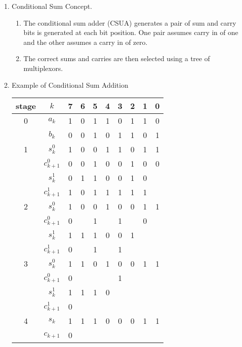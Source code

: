 \documentclass[times, twocolumn, 10pt]{article}
\begin{document}
\begin{enumerate}
\item Conditional Sum Concept. 
  \begin{enumerate}
  \item The conditional sum adder (CSUA) generates a pair of sum and carry bits
    is generated at each bit position. One pair assumes carry in of
    one and the other assumes a carry in of zero. 
  \item The correct sums and carries are then selected using a tree of
    multiplexors. 
  \end{enumerate}
\item Example of Conditional Sum Addition
  \begin{table} [h]
    \centering
    \label{csua.tbl}
    \begin{tabular}{|c|c|c|c|c|c|c|c|c|c|} \hline
      stage & $k $          & 7 & 6 & 5 & 4 & 3 & 2 & 1 & 0  \\ \hline 
      0     & $a_{k}$       & 1 & 0 & 1 & 1 & 0 & 1 & 1 & 0  \\ 
      & $b_{k}$       & 0 & 0 & 1 & 0 & 1 & 1 & 0 & 1  \\ \hline
      1     & $s_{k}^{0}$   & 1 & 0 & 0 & 1 & 1 & 0 & 1 & 1  \\
      & $c_{k+1}^{0}$ & 0 & 0 & 1 & 0 & 0 & 1 & 0 & 0  \\ \hline
      & $s_{k}^{1}$   & 0 & 1 & 1 & 0 & 0 & 1 & 0 &    \\
      & $c_{k+1}^{1}$ & 1 & 0 & 1 & 1 & 1 & 1 & 1 &    \\ \hline
      2     & $s_{k}^{0}$   & 1 & 0 & 0 & 1 & 0 & 0 & 1 & 1  \\
      & $c_{k+1}^{0}$ & 0 &   & 1 &   & 1 &   & 0 &    \\ \hline
      & $s_{k}^{1}$   & 1 & 1 & 1 & 0 & 0 & 1 &   &    \\
      & $c_{k+1}^{1}$ & 0 &   & 1 &   & 1 &   &   &    \\ \hline
      3     & $s_{k}^{0}$   & 1 & 1 & 0 & 1 & 0 & 0 & 1 & 1  \\
      & $c_{k+1}^{0}$ & 0 &   &   &   & 1 &   &   &    \\ \hline
      & $s_{k}^{1}$   & 1 & 1 & 1 & 0 &   &   &   &    \\
      & $c_{k+1}^{1}$ & 0 &   &   &   &   &   &   &    \\ \hline
      4     & $s_{k}    $   & 1 & 1 & 1 & 0 & 0 & 0 & 1 & 1  \\
      & $c_{k+1}    $ & 0 &   &   &   &   &   &   &    \\ \hline
    \end{tabular}

\end{table}
\end{enumerate}
\end{document}
